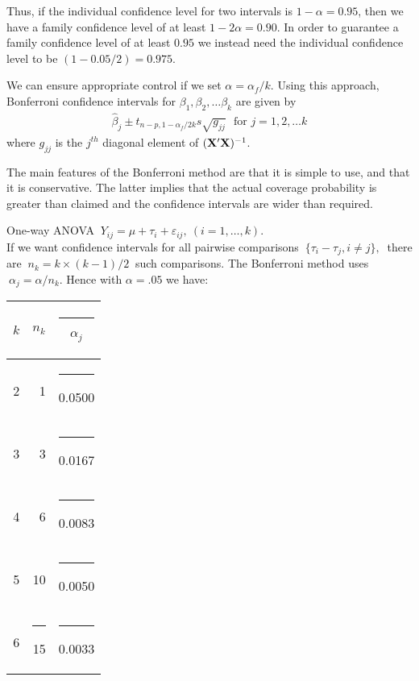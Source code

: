 Thus, if the individual confidence level for two intervals is $1-\alpha = 0.95$, then we have a family confidence level of at least $1-2\alpha = 0.90$. 
In order to guarantee a family confidence level of at least $0.95$ we instead need the individual confidence level to be $(1-0.05/2)=0.975$.
 
We can ensure appropriate control if we set $\alpha=\alpha_f/k$. 
Using this approach, Bonferroni confidence intervals for  $\beta_1, \beta_2, \ldots \beta_k$ are given by 
\begin{eqnarray*}
{\hat \beta}_j  \pm t_{n-p, 1-\alpha_f/{2k}} {s \sqrt{g_{jj}} } \,\, \mbox{      for     } j=1,2,\ldots k 
\end{eqnarray*}
where $g_{jj}$ is the $j^{th}$ diagonal element of $(\mathbf{X}' \mathbf{X})^{-1}$. 


The main features of the Bonferroni method are that it is simple to
use, and that it is conservative. The latter implies that the actual coverage
probability is greater than claimed and the confidence intervals are
wider than required.

\bexa
One-way ANOVA $\ Y_{ij}=\mu+\tau_i+\varepsilon_{ij},\ (i=1,\ldots,k).$\\

\vb
If we want confidence intervals for all pairwise comparisons $\
\{\tau_i - \tau_j, i \neq j\},\ $ there are $\ n_k = k\times (k-1)/2\
$ such comparisons.  The Bonferroni method uses $\ \alpha_j = \alpha /
n_k$. Hence with $\alpha=.05$ we have:
\begin{center}
\begin{tabular}{crc}
$k$ & $n_k$ & \rule{10mm}{0mm} $\alpha_j$\\
\hline
2 &  1 & \rule{10mm}{0mm} 0.0500\\
3 &  3 & \rule{10mm}{0mm} 0.0167\\
4 &  6 & \rule{10mm}{0mm} 0.0083\\
5 & 10 & \rule{10mm}{0mm} 0.0050\\
6 & \rule{10mm}{0mm} 15 & \rule{10mm}{0mm} 0.0033 
\end{tabular}
\end{center}
\eexa

